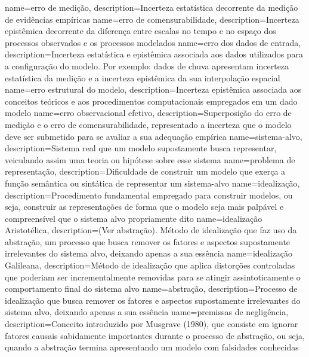 {
    name=erro de medição,
    description={Incerteza estatística decorrente da medição de evidências empíricas}
}
{
    name=erro de comensurabilidade,
    description={Incerteza epistêmica decorrente da diferença entre escalas no tempo e no espaço dos processos observados e os processos modelados}
}
{
    name=erro dos dados de entrada,
    description={Incerteza estatística e epistêmica associada aos dados utilizados para a configuração do modelo. Por exemplo: dados de chuva apresentam incerteza estatística da medição e a incerteza epistêmica da sua interpolação espacial}
}
{
    name=erro estrutural do modelo,
    description={Incerteza epistêmica associada aos conceitos teóricos e aos procedimentos computacionais empregados em um dado modelo}
}
{
    name=erro observacional efetivo,
    description={Superposição do erro de medição e o erro de comensurabilidade, representado a incerteza que o modelo deve ser submetido para se avaliar a sua adequação empírica}
}
{
    name=sistema-alvo,
    description={Sistema real que um modelo supostamente busca representar, veiculando assim uma teoria ou hipótese sobre esse sistema}
}
{
    name=problema de representação,
    description={Dificuldade de construir um modelo que exerça a função semântica ou sintática de representar um sistema-alvo}
}
{
    name=idealização,
    description={Procedimento fundamental empregado para construir modelos, ou seja, construir as representações de forma que o modelo seja mais palpável e compreensível que o sistema alvo propriamente dito}
}
{
    name=idealização Aristotélica,
    description={(Ver abstração). Método de idealização que faz uso da abstração, um processo que busca remover os fatores e aspectos supostamente irrelevantes do sistema alvo, deixando apenas a sua essência}
}
{
    name=idealização Galileana,
    description={Método de idealização que aplica distorções controladas que poderiam ser incrementalmente removidas para se atingir assintoticamente o comportamento final do sistema alvo}
}
{
    name=abstração,
    description={Processo de idealização que busca remover os fatores e aspectos supostamente irrelevantes do sistema alvo, deixando apenas a sua essência}
}
{
    name=premissas de negligência,
    description={Conceito introduzido por Musgrave (1980), que consiste em ignorar fatores causais sabidamente importantes durante o processo de abstração, ou seja, quando a abstração termina apresentando um modelo com falsidades conhecidas}
}
